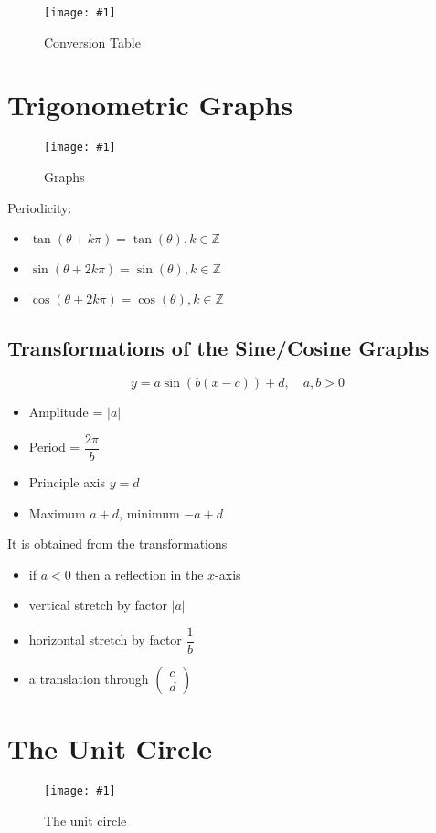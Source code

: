 \documentclass[11pt]{article}
\newcommand{\img}[3]{\begin{center}
  \begin{figure}[H]
    \centering
    \texttt{[image: \#1]}
    \caption{#3}
    \label{fig:fig1}
  \end{figure}
\end{center}}
\begin{document}
\img{imagetrigfunctions9.jpg}{0.9}{Conversion Table}

\section{Trigonometric Graphs}

\img{graphs.png}{1}{Graphs}

\noindent Periodicity:
\begin{itemize}
  \item $\tan(\theta + k\pi) = \tan(\theta), k\in \mathbb{Z}$
  \item $\sin(\theta + 2k\pi) = \sin(\theta), k\in \mathbb{Z}$
  \item $\cos(\theta + 2k\pi) = \cos(\theta), k\in \mathbb{Z}$
\end{itemize}

\pagebreak

\subsection{Transformations of the Sine/Cosine Graphs}

$$y = a\sin(b(x - c)) + d,\,\,\,\,\,\, a, b > 0$$
\begin{itemize}
  \item Amplitude = $|a|$
  \item Period = $\dfrac{2\pi}{b}$
  \item Principle axis $y = d$
  \item Maximum $a + d$, minimum $-a + d$
\end{itemize}
It is obtained from the transformations
\begin{itemize}
  \item if $a < 0$ then a reflection in the $x$-axis
  \item vertical stretch by factor $|a|$
  \item horizontal stretch by factor $\dfrac{1}{b}$
  \item a translation through $\begin{pmatrix}c\\d\end{pmatrix}$
\end{itemize}

\section{The Unit Circle}

\img{unitcirc.png}{1}{The unit circle}
\end{document}
